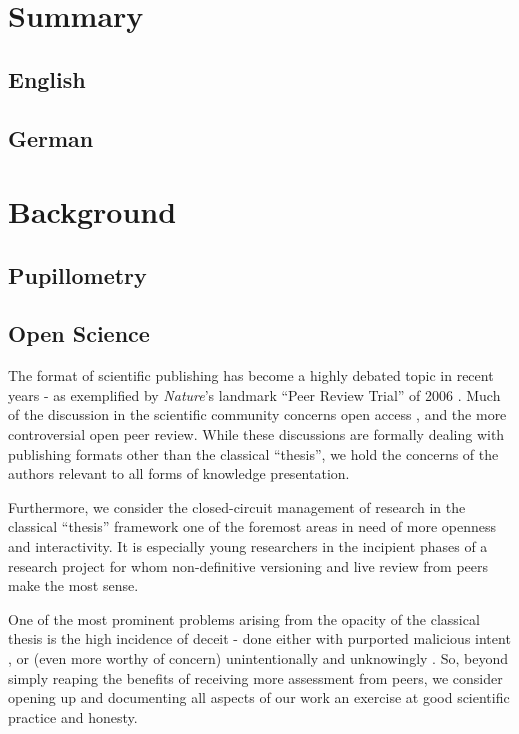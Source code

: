 
\chapter{Summary}
    \section{English}
	\readme
    \clearpage
    \section{German}
	\readme
\chapter{Background}
    \section{Pupillometry}\label{sec:b_p}
    \section{Open Science}\label{sec:b_os}
	The format of scientific publishing has become a highly debated topic in recent years - as exemplified by \textit{Nature}'s landmark “Peer Review Trial” of 2006 \cite{Nature-debate2006}.
	Much of the discussion in the scientific community concerns open access \cite{VanNoorden2013,Parker2013}, and the more controversial open peer review.
	While these discussions are formally dealing with publishing formats other than the classical “thesis”, we hold the concerns of the authors relevant to all forms of knowledge presentation.
	
	Furthermore, we consider the closed-circuit management of research in the classical “thesis” framework one of the foremost areas in need of more openness and interactivity.
	It is especially young researchers in the incipient phases of a research project for whom non-definitive versioning and live review from peers \cite{Bloom2006} make the most sense.
	
	One of the most prominent problems arising from the opacity of the classical thesis is the high incidence of deceit - 
	done either with purported malicious intent \cite{Saldana-Gastulo2010}, or (even more worthy of concern) unintentionally and unknowingly \cite{Eckel2011}.
	So, beyond simply reaping the benefits \cite{Leek2011, Akerman2006} of receiving more assessment from peers, we consider opening up and documenting all aspects of our work an exercise at good scientific practice and honesty. 
	

